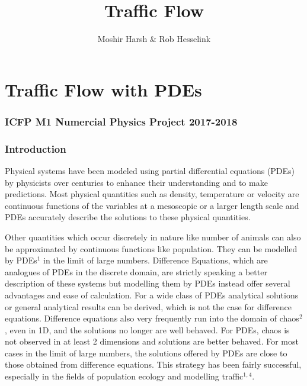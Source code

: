 \documentclass[11pt]{article}
\title{Traffic Flow}
\author{Moshir Harsh \& Rob Hesselink}
\begin{document}
    
    
    \maketitle
    
    

    
    \section{Traffic Flow with PDEs}\label{traffic-flow-with-pdes}

\subsubsection{ICFP M1 Numercial Physics Project
2017-2018}\label{icfp-m1-numercial-physics-project-2017-2018}

  

    \subsubsection{Introduction}\label{introduction}

Physical systems have been modeled using partial differential equations
(PDEs) by physicists over centuries to enhance their understanding and
to make predictions. Most physical quantities such as density,
temperature or velocity are continuous functions of the variables at a
mesoscopic or a larger length scale and PDEs accurately describe the
solutions to these physical quantities.

Other quantities which occur discretely in nature like number of animals
can also be approximated by continuous functions like population. They
can be modelled by PDEs\(^1\) in the limit of large numbers. Difference
Equations, which are analogues of PDEs in the discrete domain, are
strictly speaking a better description of these systems but modelling
them by PDEs instead offer several advantages and ease of calculation.
For a wide class of PDEs analytical solutions or general analytical
results can be derived, which is not the case for difference equations.
Difference equations also very frequently run into the domain of
chaos\(^2\), even in 1D, and the solutions no longer are well behaved.
For PDEs, chaos is not observed in at least 2 dimensions and solutions
are better behaved. For most cases in the limit of large numbers, the
solutions offered by PDEs are close to those obtained from difference
equations. This strategy has been fairly successful, especially in the
fields of population ecology and modelling traffic\(^{1,4}\).
\end{document}
